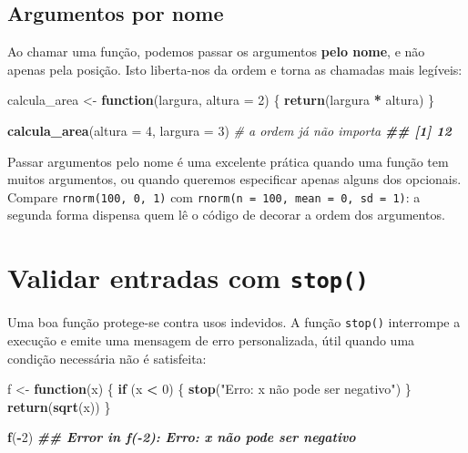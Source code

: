 \documentclass[
  portuguese,
  11pt,
  openany]{book}
\newenvironment{Shaded}{\begin{snugshade}}{\end{snugshade}}
\newcommand{\AttributeTok}[1]{\textcolor[rgb]{0.13,0.29,0.53}{#1}}
\newcommand{\CommentTok}[1]{\textcolor[rgb]{0.56,0.35,0.01}{\textit{#1}}}
\newcommand{\ControlFlowTok}[1]{\textcolor[rgb]{0.13,0.29,0.53}{\textbf{#1}}}
\newcommand{\DecValTok}[1]{\textcolor[rgb]{0.00,0.00,0.81}{#1}}
\newcommand{\DocumentationTok}[1]{\textcolor[rgb]{0.56,0.35,0.01}{\textbf{\textit{#1}}}}
\newcommand{\FunctionTok}[1]{\textcolor[rgb]{0.13,0.29,0.53}{\textbf{#1}}}
\newcommand{\NormalTok}[1]{#1}
\newcommand{\OtherTok}[1]{\textcolor[rgb]{0.56,0.35,0.01}{#1}}
\newcommand{\SpecialCharTok}[1]{\textcolor[rgb]{0.81,0.36,0.00}{\textbf{#1}}}
\newcommand{\StringTok}[1]{\textcolor[rgb]{0.31,0.60,0.02}{#1}}
\begin{document}
\subsection{Argumentos por nome}\label{argumentos-por-nome}

Ao chamar uma função, podemos passar os argumentos \textbf{pelo nome}, e não apenas
pela posição. Isto liberta-nos da ordem e torna as chamadas mais legíveis:

\begin{Shaded}
\begin{Highlighting}[]
\NormalTok{calcula\_area }\OtherTok{\textless{}{-}} \ControlFlowTok{function}\NormalTok{(largura, }\AttributeTok{altura =} \DecValTok{2}\NormalTok{) \{}
  \FunctionTok{return}\NormalTok{(largura }\SpecialCharTok{*}\NormalTok{ altura)}
\NormalTok{\}}

\FunctionTok{calcula\_area}\NormalTok{(}\AttributeTok{altura =} \DecValTok{4}\NormalTok{, }\AttributeTok{largura =} \DecValTok{3}\NormalTok{)   }\CommentTok{\# a ordem já não importa}
\DocumentationTok{\#\# [1] 12}
\end{Highlighting}
\end{Shaded}

Passar argumentos pelo nome é uma excelente prática quando uma função tem muitos
argumentos, ou quando queremos especificar apenas alguns dos opcionais. Compare
\texttt{rnorm(100,\ 0,\ 1)} com \texttt{rnorm(n\ =\ 100,\ mean\ =\ 0,\ sd\ =\ 1)}: a segunda forma
dispensa quem lê o código de decorar a ordem dos argumentos.

\section{\texorpdfstring{Validar entradas com \texttt{stop()}}{Validar entradas com stop()}}\label{validar-entradas-com-stop}

Uma boa função protege-se contra usos indevidos. A função \texttt{stop()} interrompe a
execução e emite uma mensagem de erro personalizada, útil quando uma condição
necessária não é satisfeita:

\begin{Shaded}
\begin{Highlighting}[]
\NormalTok{f }\OtherTok{\textless{}{-}} \ControlFlowTok{function}\NormalTok{(x) \{}
  \ControlFlowTok{if}\NormalTok{ (x }\SpecialCharTok{\textless{}} \DecValTok{0}\NormalTok{) \{}
    \FunctionTok{stop}\NormalTok{(}\StringTok{"Erro: x não pode ser negativo"}\NormalTok{)}
\NormalTok{  \}}
  \FunctionTok{return}\NormalTok{(}\FunctionTok{sqrt}\NormalTok{(x))}
\NormalTok{\}}

\FunctionTok{f}\NormalTok{(}\SpecialCharTok{{-}}\DecValTok{2}\NormalTok{)}
\DocumentationTok{\#\# Error in f({-}2): Erro: x não pode ser negativo}
\end{Highlighting}
\end{Shaded}
\end{document}
